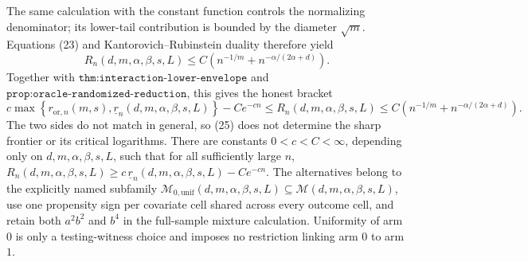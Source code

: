The same calculation with the constant function controls the normalizing denominator; its lower-tail contribution is bounded by the diameter \(\sqrt m\).  Equations (23) and Kantorovich--Rubinstein duality therefore yield
\[
 R_n(d,m,\alpha,\beta,s,L)
 \leq C\left(n^{-1/m}+n^{-\alpha/(2\alpha+d)}\right).
 \tag{24}
\]
Together with \(\texttt{thm:interaction-lower-envelope}\) and \(\texttt{prop:oracle-randomized-reduction}\), this gives the honest bracket
\[
 c\max\left\{r_{\mathrm{or},n}(m,s),
              \underline r_n(d,m,\alpha,\beta,s,L)\right\}-Ce^{-cn}
 \leq R_n(d,m,\alpha,\beta,s,L)
 \leq C\left(n^{-1/m}+n^{-\alpha/(2\alpha+d)}\right).
 \tag{25}
\]
The two sides do not match in general, so (25) does not determine the sharp frontier or its critical logarithms.
There are constants \(0<c<C<\infty\), depending only on \(d,m,\alpha,\beta,s,L\), such that for all sufficiently large \(n\), \(R_n(d,m,\alpha,\beta,s,L)\ge c\,\underline r_n(d,m,\alpha,\beta,s,L)-C e^{-cn}\). The alternatives belong to the explicitly named subfamily \(\mathcal M_{0,\mathrm{unif}}(d,m,\alpha,\beta,s,L)\subseteq\mathcal M(d,m,\alpha,\beta,s,L)\), use one propensity sign per covariate cell shared across every outcome cell, and retain both \(a^2b^2\) and \(b^4\) in the full-sample mixture calculation. Uniformity of arm \(0\) is only a testing-witness choice and imposes no restriction linking arm \(0\) to arm \(1\).
